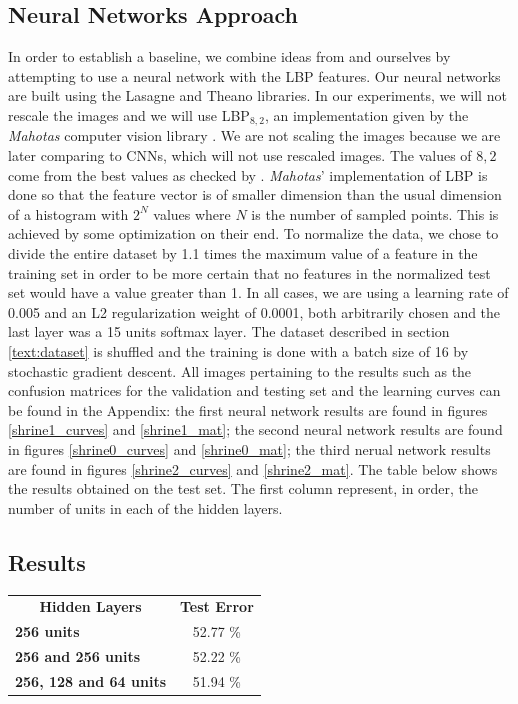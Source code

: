\begin{multicols}{2}
\section{Neural Networks Approach}
In order to establish a baseline, we combine ideas from \citet{kylberg2011virus} and ourselves by attempting to use a neural network with the LBP features. Our neural networks are built using the Lasagne and Theano \cite{Bastien-Theano-2012, bergstra+al:2010-scipy} libraries. In our experiments, we will not rescale the images and we will use LBP$_{8,2}$, an implementation given by the \emph{Mahotas} computer vision library \citet{coelho2012mahotas}. We are not scaling the images because we are later comparing to CNNs, which will not use rescaled images. The values of $8,2$ come from the best values as checked by \citet{kylberg2011virus}. \emph{Mahotas}' implementation of LBP is done so that the feature vector is of smaller dimension than the usual dimension of a histogram with $2^N$ values where $N$ is the number of sampled points. This is achieved by some optimization on their end. 
To normalize the data, we chose to divide the entire dataset by 1.1 times the maximum value of a feature in the training set in order to be more certain that no features in the normalized test set would have a value greater than 1. In all cases, we are using a learning rate of 0.005 and an L2 regularization weight of 0.0001, both arbitrarily chosen and the last layer was a 15 units softmax layer. The dataset described in section \ref{text:dataset} is shuffled and the training is done with a batch size of 16 by stochastic gradient descent. All images pertaining to the results such as the confusion matrices for the validation and testing set and the learning curves can be found in the Appendix: the first neural network results are found in figures \ref{shrine1_curves} and \ref{shrine1_mat}; the second neural network results are found in figures \ref{shrine0_curves} and \ref{shrine0_mat}; the third nerual network results are found in figures \ref{shrine2_curves} and \ref{shrine2_mat}. The table below shows the results obtained on the test set. The first column represent, in order, the number of units in each of the hidden layers. 
\subsection{Results}

\begin{tabular}{lc}
\multicolumn{1}{c}{\textbf{Hidden Layers}} & \textbf{Test Error} \\
\textbf{256 units}                         &   52.77 \%          \\
\textbf{256 and 256 units}                 &   52.22 \%          \\
\textbf{256, 128 and 64 units}             &   51.94 \%                 
\end{tabular}


\end{multicols}

